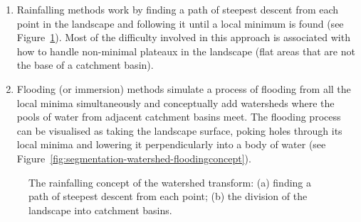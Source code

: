 \documentclass[preprint,a4paper]{elsarticle}
\newenvironment{stusubfig}[1]
{
	\begin{figure}[#1]
	\begin{center}
}
{
	\end{center}
	\end{figure}
}
\begin{document}
\begin{enumerate}

\item Rainfalling methods \cite{meijster98,osma-ruiz06,stoev00} work by finding a path of steepest descent from each point in the landscape and following it until a local minimum is found (see Figure~\ref{fig:segmentation-watershed-rainfallingconcept}). Most of the difficulty involved in this approach is associated with how to handle non-minimal plateaux in the landscape (flat areas that are not the base of a catchment basin).

\item Flooding (or immersion) methods \cite{bieniek00,rambabu07} simulate a process of flooding from all the local minima simultaneously and conceptually add watersheds where the pools of water from adjacent catchment basins meet. The flooding process can be visualised as taking the landscape surface, poking holes through its local minima and lowering it perpendicularly into a body of water (see Figure~\ref{fig:segmentation-watershed-floodingconcept}).

\end{enumerate}

\begin{stusubfig}{p}
	\hspace{4mm}%
\caption{The rainfalling concept of the watershed transform: (a) finding a path of steepest descent from each point; (b) the division of the landscape into catchment basins.}
\label{fig:segmentation-watershed-rainfallingconcept}
\end{stusubfig}
\end{document}
